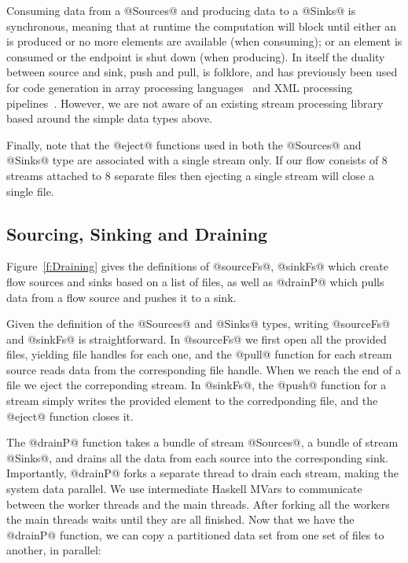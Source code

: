 Consuming data from a @Sources@ and producing data to a @Sinks@ is synchronous, meaning that at runtime the computation will block until either an is produced or no more elements are available (when consuming); or an element is consumed or the endpoint is shut down (when producing). In itself the duality between source and sink, push and pull, is folklore, and has previously been used for code generation in array processing languages~\cite{Claessen:ExpressiveArray} and XML processing pipelines~\cite{Kay:YouPull}. However, we are not aware of an existing stream processing library based around the simple data types above.

Finally, note that the @eject@ functions used in both the @Sources@ and @Sinks@ type are associated with a single stream only. If our flow consists of 8 streams attached to 8 separate files then ejecting a single stream will close a single file.


\subsection{Sourcing, Sinking and Draining}
Figure~\ref{f:Draining} gives the definitions of @sourceFs@, @sinkFs@ which create flow sources and sinks based on a list of files, as well as @drainP@ which pulls data from a flow source and pushes it to a sink. 

Given the definition of the @Sources@ and @Sinks@ types, writing @sourceFs@ and @sinkFs@ is straightforward. In @sourceFs@ we first open all the provided files, yielding file handles for each one, and the @pull@ function for each stream source reads data from the corresponding file handle. When we reach the end of a file we eject the correponding stream. In @sinkFs@, the @push@ function for a stream simply writes the provided element to the corredponding file, and the @eject@ function closes it.

The @drainP@ function takes a bundle of stream @Sources@, a bundle of stream @Sinks@, and drains all the data from each source into the corresponding sink. Importantly, @drainP@ forks a separate thread to drain each stream, making the system data parallel. We use intermediate Haskell MVars to communicate between the worker threads and the main threads. After forking all the workers the main threads waits until they are all finished. Now that we have the @drainP@ function, we can copy a partitioned data set from one set of files to another, in parallel:


